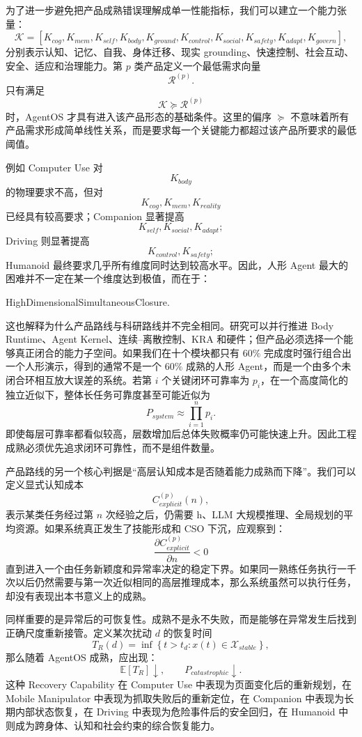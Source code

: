 为了进一步避免把产品成熟错误理解成单一性能指标，我们可以建立一个能力张量：
\[
\mathcal{K}
=
\left[
K_{cog},
K_{mem},
K_{self},
K_{body},
K_{ground},
K_{control},
K_{social},
K_{safety},
K_{adapt},
K_{govern}
\right],
\]
分别表示认知、记忆、自我、身体迁移、现实 grounding、快速控制、社会互动、安全、适应和治理能力。第 $p$ 类产品定义一个最低需求向量
\[
\mathcal{R}^{(p)}.
\]
只有满足
\[
\mathcal{K}
\succeq
\mathcal{R}^{(p)}
\]
时，AgentOS 才具有进入该产品形态的基础条件。这里的偏序 $\succeq$ 不意味着所有产品需求形成简单线性关系，而是要求每一个关键能力都超过该产品所要求的最低阈值。

例如 Computer Use 对
\[
K_{body}
\]
的物理要求不高，但对
\[
K_{cog},K_{mem},K_{reality}
\]
已经具有较高要求；Companion 显著提高
\[
K_{self},K_{social},K_{adapt};
\]
Driving 则显著提高
\[
K_{control},K_{safety};
\]
Humanoid 最终要求几乎所有维度同时达到较高水平。因此，人形 Agent 最大的困难并不一定在某一个维度达到极值，而在于：
\begin{statementbox}
HighDimensionalSimultaneousClosure.
\end{statementbox}

这也解释为什么产品路线与科研路线并不完全相同。研究可以并行推进 Body Runtime、Agent Kernel、连续--离散控制、KRA 和硬件；但产品必须选择一个能够真正闭合的能力子空间。如果我们在十个模块都只有 $60\%$ 完成度时强行组合出一个人形演示，得到的通常不是一个 $60\%$ 成熟的人形 Agent，而是一个由多个未闭合环相互放大误差的系统。若第 $i$ 个关键闭环可靠率为 $p_i$，在一个高度简化的独立近似下，整体长任务可靠度甚至可能近似为
\[
P_{system}
\approx
\prod_{i=1}^{n}p_i.
\]
即使每层可靠率都看似较高，层数增加后总体失败概率仍可能快速上升。因此工程成熟必须优先追求闭环可靠性，而不是组件数量。

产品路线的另一个核心判据是“高层认知成本是否随着能力成熟而下降”。我们可以定义显式认知成本
\[
C_{explicit}^{(p)}(n),
\]
表示某类任务经过第 $n$ 次经验之后，仍需要 h、LLM 大规模推理、全局规划的平均资源。如果系统真正发生了技能形成和 CSO 下沉，应观察到：
\[
\frac{\partial C_{explicit}^{(p)}}{\partial n}
<
0
\]
直到进入一个由任务新颖度和异常率决定的稳定下界。如果同一熟练任务执行一千次以后仍然需要与第一次近似相同的高层推理成本，那么系统虽然可以执行任务，却没有表现出本书意义上的成熟。

同样重要的是异常后的可恢复性。成熟不是永不失败，而是能够在异常发生后找到正确尺度重新接管。定义某次扰动 $d$ 的恢复时间
\[
T_R(d)
=
\inf
\left\{
t>t_d:
x(t)\in\mathcal{X}_{stable}
\right\},
\]
那么随着 AgentOS 成熟，应出现：
\[
\mathbb{E}[T_R]\downarrow,
\qquad
P_{catastrophic}\downarrow.
\]
这种 Recovery Capability 在 Computer Use 中表现为页面变化后的重新规划，在 Mobile Manipulator 中表现为抓取失败后的重新定位，在 Companion 中表现为长期内部状态恢复，在 Driving 中表现为危险事件后的安全回归，在 Humanoid 中则成为跨身体、认知和社会约束的综合恢复能力。

